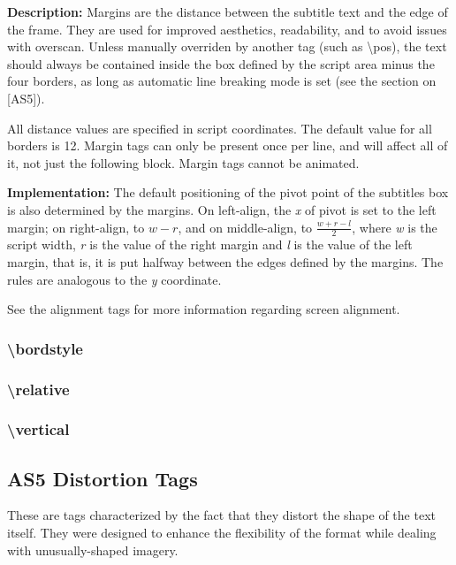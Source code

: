 \documentclass{spec}
\begin{document}
\textbf{Description:}
Margins are the distance between the subtitle text and the edge of the frame. They are used for
improved aesthetics, readability, and to avoid issues with overscan. Unless manually overriden
by another tag (such as \textbackslash pos), the text should always be contained inside the box
defined by the script area minus the four borders, as long as automatic line breaking mode is
set (see the section on [AS5]).

All distance values are specified in script coordinates. The default value for all borders is 12.
Margin tags can only be present once per line, and will affect all of it, not just the following
block. Margin tags cannot be animated.

\textbf{Implementation:}
The default positioning of the pivot point of the subtitles box is also determined by the margins.
On left-align, the \emph{x} of pivot is set to the left margin; on right-align, to $w - r$,
and on middle-align, to $\frac{w + r - l}{2}$, where \emph{w} is the script width, \emph{r} is
the value of the right margin and \emph{l} is the value of the left margin, that is, it is put
halfway between the edges defined by the margins. The rules are analogous to the \emph{y} coordinate.

See the alignment tags for more information regarding screen alignment.


\subsubsection{\textbackslash bordstyle}

\subsubsection{\textbackslash relative}

\subsubsection{\textbackslash vertical}


\subsection{AS5 Distortion Tags}
These are tags characterized by the fact that they distort the shape of the text itself. They
were designed to enhance the flexibility of the format while dealing with unusually-shaped
imagery.
\end{document}
